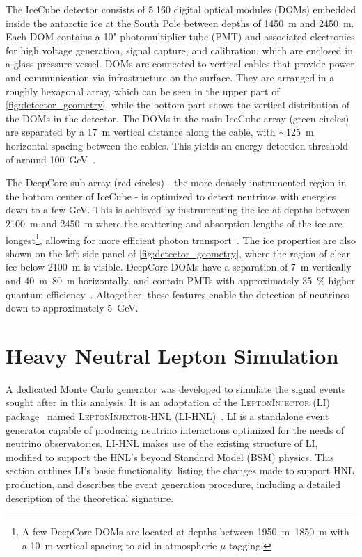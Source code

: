 \documentclass[
    aps,
    prd,
    reprint,
    amsmath,
    amssymb,
    nofootinbib,
    superscriptaddress,
    floatfix
]{revtex4-2}
\newcommand{\gev}{\giga\electronvolt}
\begin{document}
The IceCube detector consists of 5,160 digital optical modules (DOMs) embedded inside the antarctic ice at the South Pole between depths of \SI{1450}{\m} and \SI{2450}{\m}. Each DOM contains a 10" photomultiplier tube (PMT) and associated electronics for high voltage generation, signal capture, and calibration, which are enclosed in a glass pressure vessel. DOMs are connected to vertical cables that provide power and communication via infrastructure on the surface. They are arranged in a roughly hexagonal array, which can be seen in the upper part of \cref{fig:detector_geometry}, while the bottom part shows the vertical distribution of the DOMs in the detector. The DOMs in the main IceCube array (green circles) are separated by a \SI{17}{\m} vertical distance along the cable, with $\sim$\SI{125}{\m} horizontal spacing between the cables. This yields an energy detection threshold of around \SI{100}{\gev}~\cite{IceCube:2016zyt}.

The DeepCore sub-array (red circles) - the more densely instrumented region in the bottom center of IceCube - is optimized to detect neutrinos with energies down to a few GeV. This is achieved by instrumenting the ice at depths between \SI{2100}{\m} and \SI{2450}{\m} where the scattering and absorption lengths of the ice are longest\footnote{A few DeepCore DOMs are located at depths between \SIrange{1950}{1850}{\m} with a \SI{10}{\m} vertical spacing to aid in atmospheric $\mu$ tagging.}, allowing for more efficient photon transport~\cite{ice_calibration}. The ice properties are also shown on the left side panel of \cref{fig:detector_geometry}, where the region of clear ice below \SI{2100}{\m} is visible. DeepCore DOMs have a separation of \SI{7}{\m} vertically and \SIrange{40}{80}{\m} horizontally, and contain PMTs with approximately \SI{35}{\percent} higher quantum efficiency~\cite{IceCube:2011ucd}. Altogether, these features enable the detection of neutrinos down to approximately \SI{5}{\gev}.




\section{\label{sec:generator}Heavy Neutral Lepton Simulation}

A dedicated Monte Carlo generator was developed to simulate the signal events sought after in this analysis. It is an adaptation of the \textsc{LeptonInjector} (LI) package~\cite{IceCube:2020tcq} named \textsc{LeptonInjector-HNL} (LI-HNL)~\cite{LeptonInjector-HNL}. LI is a standalone event generator capable of producing neutrino interactions optimized for the needs of neutrino observatories. LI-HNL makes use of the existing structure of LI, modified to support the HNL's beyond Standard Model (BSM) physics.
This section outlines LI's basic functionality, listing the changes made to support HNL production, and describes the event generation procedure, including a detailed description of the theoretical signature.
\end{document}
